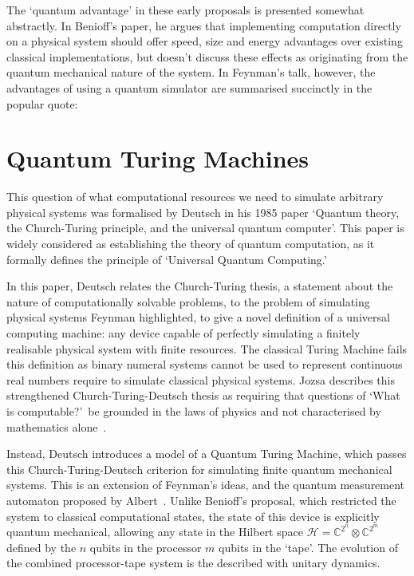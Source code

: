 \documentclass{standalone}
\begin{document}
\par
The `quantum advantage' in these early proposals is presented somewhat abstractly. In Benioff's paper, he argues that implementing computation directly on a physical system should offer speed, size and energy advantages over existing classical implementations, but doesn't discuss these effects as originating from the quantum mechanical nature of the system. In Feynman's talk, however, the advantages of using a quantum simulator are summarised succinctly in the popular quote:
\par

\section{Quantum Turing Machines}\label{sec:QTM}
This question of what computational resources we need to simulate arbitrary physical systems was formalised by Deutsch in his 1985 paper `Quantum theory, the Church-Turing principle, and the universal quantum computer'. This paper is widely considered as establishing the theory of quantum computation, as it formally defines the principle of `Universal Quantum Computing.' 
\par
In this paper, Deutsch relates the Church-Turing thesis, a statement about the nature of computationally solvable problems, to the problem of simulating physical systems Feynman highlighted, to give a novel definition of a universal computing machine: any device capable of perfectly simulating a finitely realisable physical system with finite resources. The classical Turing Machine fails this definition as binary numeral systems cannot be used to represent continuous real numbers require to simulate classical physical systems. Jozsa describes this strengthened Church-Turing-Deutsch thesis as requiring that questions of `What is computable?'\ be grounded in the laws of physics and not characterised by mathematics alone~\cite{Jozsa1997}.
\par
Instead, Deutsch introduces a model of a Quantum Turing Machine, which passes this Church-Turing-Deutsch criterion for simulating finite quantum mechanical systems. This is an extension of Feynman's ideas, and the quantum measurement automaton proposed by Albert~\cite{Albert1983}. Unlike Benioff's proposal, which restricted the system to classical computational states, the state of this device is explicitly quantum mechanical, allowing any state in the Hilbert space $\mathcal{H}=\mathbb{C}^{2^{n}} \otimes \mathbb{C}^{2^{m}}$ defined by the $n$ qubits in the processor $m$ qubits in the `tape'. The evolution of the combined processor-tape system is the described with unitary dynamics. 
\end{document}
